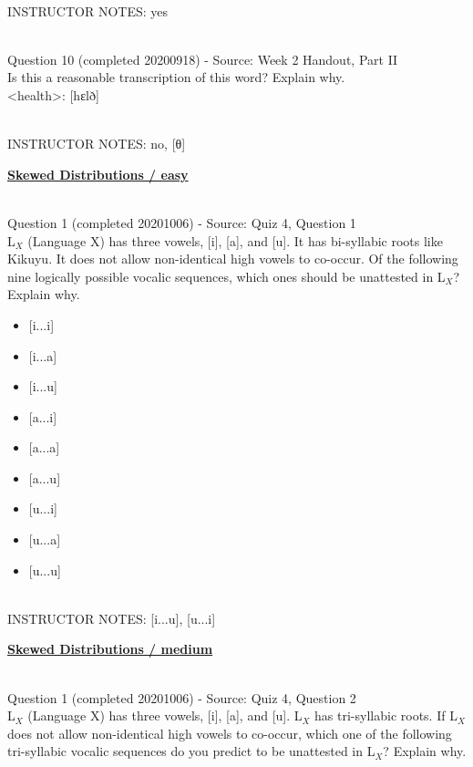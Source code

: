 \documentclass[12pt]{article}
\begin{document}
~\\
INSTRUCTOR NOTES: yes


~\\

{\large Question 10} (completed 20200918) - Source: Week 2 Handout, Part II\\

Is this a reasonable transcription of this word? Explain why.\\

<health>: {[hɛlð]}


~\\
INSTRUCTOR NOTES: no, [θ]


\newpage\textbf{\underline{\huge Skewed Distributions / easy\\}}

~\\

{\large Question 1} (completed 20201006) - Source: Quiz 4, Question 1\\

L$_X$ (Language X) has three vowels, [i], [a], and [u]. It has bi-syllabic roots like Kikuyu. It does not allow non-identical high vowels to co-occur. Of the following nine logically possible vocalic sequences, which ones should be unattested in L$_X$? Explain why.\\

\begin{itemize} \item {[i...i]} \item {[i...a]} \item {[i...u]} \item {[a...i]} \item {[a...a]} \item {[a...u]} \item {[u...i]} \item {[u...a]} \item {[u...u]} \end{itemize}


~\\
INSTRUCTOR NOTES: [i...u], [u...i]


\newpage\textbf{\underline{\huge Skewed Distributions / medium\\}}

~\\

{\large Question 1} (completed 20201006) - Source: Quiz 4, Question 2\\

L$_X$ (Language X) has three vowels, [i], [a], and [u]. L$_X$ has tri-syllabic roots. If L$_X$ does not allow non-identical high vowels to co-occur, which one of the following tri-syllabic vocalic sequences do you predict to be unattested in L$_X$? Explain why.\\
\end{document}
